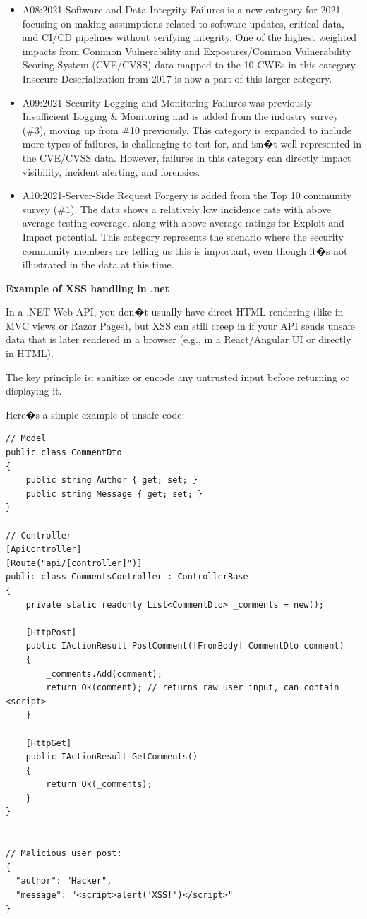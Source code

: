 \begin{itemize}
\item A08:2021-Software and Data Integrity Failures is a new category for 2021, focusing on making assumptions related to software updates, critical data, and CI/CD pipelines without verifying integrity. One of the highest weighted impacts from Common Vulnerability and Exposures/Common Vulnerability Scoring System (CVE/CVSS) data mapped to the 10 CWEs in this category. Insecure Deserialization from 2017 is now a part of this larger category.

\item A09:2021-Security Logging and Monitoring Failures was previously Insufficient Logging \& Monitoring and is added from the industry survey (\#3), moving up from \#10 previously. This category is expanded to include more types of failures, is challenging to test for, and isn�t well represented in the CVE/CVSS data. However, failures in this category can directly impact visibility, incident alerting, and forensics.

\item A10:2021-Server-Side Request Forgery is added from the Top 10 community survey (\#1). The data shows a relatively low incidence rate with above average testing coverage, along with above-average ratings for Exploit and Impact potential. This category represents the scenario where the security community members are telling us this is important, even though it�s not illustrated in the data at this time.

\end{itemize}

\medskip

\textbf{Example of XSS handling in .net}

In a .NET Web API, you don�t usually have direct HTML rendering (like in MVC views or Razor Pages), but XSS can still creep in if your API sends unsafe data that is later rendered in a browser (e.g., in a React/Angular UI or directly in HTML).

The key principle is: sanitize or encode any untrusted input before returning or displaying it.

Here�s a simple example of unsafe code:

\begin{lstlisting}
// Model
public class CommentDto
{
    public string Author { get; set; }
    public string Message { get; set; }
}

// Controller
[ApiController]
[Route("api/[controller]")]
public class CommentsController : ControllerBase
{
    private static readonly List<CommentDto> _comments = new();

    [HttpPost]
    public IActionResult PostComment([FromBody] CommentDto comment)
    {
        _comments.Add(comment);
        return Ok(comment); // returns raw user input, can contain <script>
    }

    [HttpGet]
    public IActionResult GetComments()
    {
        return Ok(_comments);
    }
}


// Malicious user post:
{
  "author": "Hacker",
  "message": "<script>alert('XSS!')</script>"
}


\end{lstlisting}

